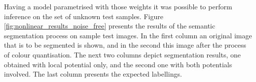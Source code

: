Having a model parametrised with those weights it was possible to perform inference on the set of unknown test samples. Figure \ref{fig:nonlinear_results_noise_free} presents the results of the semantic segmentation process on sample test images. In the first column an original image that is to be segmented is shown, and in the second this image after the process of colour quantisation. The next two columns depict segmentation results, one obtained with local potential only, and the second one with both potentials involved. The last column presents the expected labellings.  
\begin{figure}[!htb]
 \centering
 \setlength{\tabcolsep}{2pt}
    \begin{tabular}{m{}m{}m{}
    m{}m{}}
    

\end{tabular}
\end{figure}
